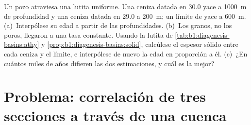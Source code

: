 \begin{exercise}[$\star\star\star$]\label{exo:b1:stratigraphic-scale:12}
Un pozo atraviesa una lutita uniforme. Una ceniza datada en \qty{30.0}{\Ma} yace a \qty{1000}{m} de profundidad y una ceniza datada en \qty{29.0}{\Ma} a \qty{200}{m}; un límite de  yace a \qty{600}{m}. (a)~Interpólese
su edad a partir de las profundidades. (b)~Los granos, no los poros, llegaron a una tasa constante. Usando la lutita de \cref{tab:b1:diagenesis-basins:athy} y \cref{prop:b1:diagenesis-basins:solid}, calcúlese
el espesor sólido entre cada ceniza y el límite, e interpólese de nuevo la edad en proporción a él. (c)~¿En cuántos miles de años difieren las dos estimaciones, y cuál es la mejor?
\end{exercise}

\section{Problema: correlación de tres secciones a través de una cuenca}


